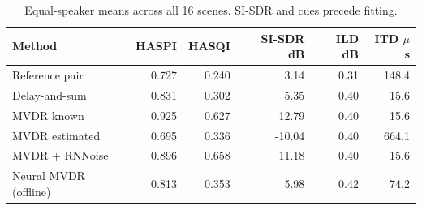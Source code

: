 \begin{table}[htbp]\centering\small
\caption{Equal-speaker means across all 16 scenes. SI-SDR and cues precede fitting.}
\begin{tabular}{lrrrrr}\toprule
Method & HASPI & HASQI & SI-SDR dB & ILD dB & ITD $\mu$s \\
\midrule
Reference pair & 0.727 & 0.240 & 3.14 & 0.31 & 148.4 \\
Delay-and-sum & 0.831 & 0.302 & 5.35 & 0.40 & 15.6 \\
MVDR known & 0.925 & 0.627 & 12.79 & 0.40 & 15.6 \\
MVDR estimated & 0.695 & 0.336 & -10.04 & 0.40 & 664.1 \\
MVDR + RNNoise & 0.896 & 0.658 & 11.18 & 0.40 & 15.6 \\
Neural MVDR (offline) & 0.813 & 0.353 & 5.98 & 0.42 & 74.2 \\
\bottomrule\end{tabular}\end{table}
